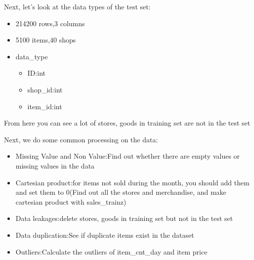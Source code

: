  Next, let's look at the data types of the test set:
  \begin{itemize}
    \item 214200 rows,3 columns
    \item 5100 items,40 shops
    \item data_type
          \begin{itemize}
            \item ID:int
            \item shop_id:int
            \item item_id:int
          \end{itemize}
  \end{itemize}
  From here you can see a lot of stores, goods in training set are not in the test set\par
  Next, we do some common processing on the data:\par
  \begin{itemize}
      \item Missing Value and Non Value:Find out whether there are empty values or missing values in the data
      \item Cartesian product:for items not sold during the month, you should add them and set them to 0(Find out all the stores and merchandise, and make cartesian product with sales_trainz)
      \item Data leakages:delete stores, goods in training set but not in the test set
      \item Data duplication:See if duplicate items exist in the dataset
      \item Outliers:Calculate the outliers of item_cnt_day and item price
  \end{itemize}
